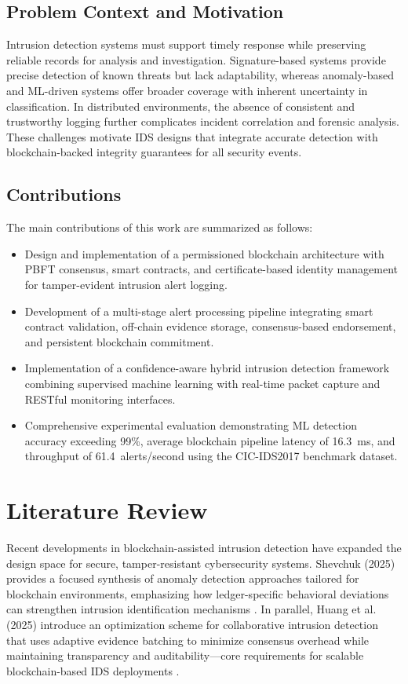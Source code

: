 \documentclass[conference]{IEEEtran}
\begin{document}
\subsection{Problem Context and Motivation}

Intrusion detection systems must support timely response while preserving reliable records for analysis and investigation. Signature-based systems provide precise detection of known threats but lack adaptability, whereas anomaly-based and ML-driven systems offer broader coverage with inherent uncertainty in classification. In distributed environments, the absence of consistent and trustworthy logging further complicates incident correlation and forensic analysis. These challenges motivate IDS designs that integrate accurate detection with blockchain-backed integrity guarantees for all security events.

\subsection{Contributions}

The main contributions of this work are summarized as follows:
\begin{itemize}
    \item Design and implementation of a permissioned blockchain architecture with PBFT consensus, smart contracts, and certificate-based identity management for tamper-evident intrusion alert logging.
    \item Development of a multi-stage alert processing pipeline integrating smart contract validation, off-chain evidence storage, consensus-based endorsement, and persistent blockchain commitment.
    \item Implementation of a confidence-aware hybrid intrusion detection framework combining supervised machine learning with real-time packet capture and RESTful monitoring interfaces.
    \item Comprehensive experimental evaluation demonstrating ML detection accuracy exceeding 99\%, average blockchain pipeline latency of 16.3~ms, and throughput of 61.4~alerts/second using the CIC-IDS2017 benchmark dataset.
\end{itemize}



\section{Literature Review}

Recent developments in blockchain-assisted intrusion detection have expanded the design space for secure, tamper-resistant cybersecurity systems. Shevchuk (2025) provides a focused synthesis of anomaly detection approaches tailored for blockchain environments, emphasizing how ledger-specific behavioral deviations can strengthen intrusion identification mechanisms \cite{shevc2025anomaly}. In parallel, Huang et al. (2025) introduce an optimization scheme for collaborative intrusion detection that uses adaptive evidence batching to minimize consensus overhead while maintaining transparency and auditability—core requirements for scalable blockchain-based IDS deployments \cite{jhuang2025opt}.
\end{document}
